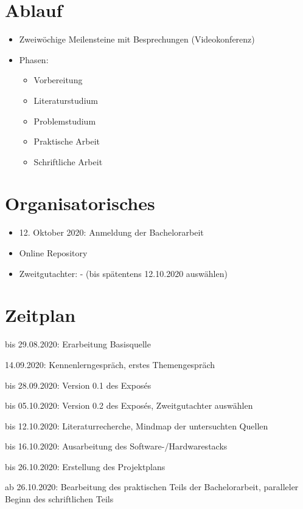 \documentclass[11pt]{article}
\newcommand{\cmark}{\ding{51}}%
\newcommand{\done}{\rlap{$\square$}{\raisebox{2pt}{\large\hspace{1pt}\cmark}}%
\hspace{-2.5pt}}
\begin{document}
    \section{Ablauf}
    \begin{itemize}
        \item Zweiwöchige Meilensteine mit Besprechungen (Videokonferenz)
        \item Phasen:
        \begin{itemize}
            \item Vorbereitung
            \item Literaturstudium
            \item Problemstudium
            \item Praktische Arbeit
            \item Schriftliche Arbeit
        \end{itemize}
    \end{itemize}

    \section{Organisatorisches}
    \begin{itemize}
        \item 12. Oktober 2020: Anmeldung der Bachelorarbeit
        \item Online Repository~\cite{github}
        \item Zweitgutachter: - (bis spätentens 12.10.2020 auswählen)
    \end{itemize}

    \section{Zeitplan}
    \begin{todolist}
        \item[\done] bis 29.08.2020: Erarbeitung Basisquelle
        \item[\done] 14.09.2020: Kennenlerngespräch, erstes Themengespräch
        \item[\done] bis 28.09.2020: Version 0.1 des Exposés
        \item bis 05.10.2020: Version 0.2 des Exposés, Zweitgutachter auswählen
        \item bis 12.10.2020: Literaturrecherche, Mindmap der untersuchten Quellen
        \item bis 16.10.2020: Ausarbeitung des Software-/Hardwarestacks
        \item bis 26.10.2020: Erstellung des Projektplans
        \item ab 26.10.2020: Bearbeitung des praktischen Teils der Bachelorarbeit, paralleler Beginn des
        schriftlichen Teils
    \end{todolist}

    \newpage

    ~\nocite{*}
    
    
\end{document}
